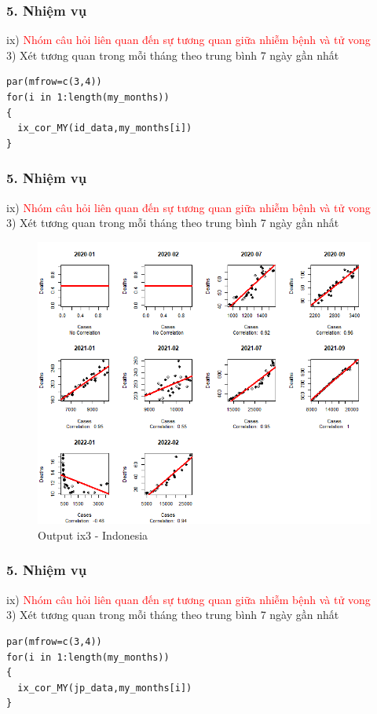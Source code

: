 \documentclass[english,10pt,table]{beamer}
\begin{document}
\begin{frame}[fragile]
\frametitle{5.  Nhiệm vụ}
ix) \textcolor{red}{Nhóm câu hỏi liên quan đến sự tương quan giữa nhiễm bệnh và tử vong}\\
3) Xét tương quan trong mỗi tháng theo trung bình 7 ngày gần nhất
  \lstset{
    title=Source code for Indonesia}
\begin{lstlisting}[frame=single]  
par(mfrow=c(3,4))
for(i in 1:length(my_months))
{
  ix_cor_MY(id_data,my_months[i])
}
\end{lstlisting}
\end{frame}

\begin{frame}[fragile]
\frametitle{5.  Nhiệm vụ}
ix) \textcolor{red}{Nhóm câu hỏi liên quan đến sự tương quan giữa nhiễm bệnh và tử vong}\\
3) Xét tương quan trong mỗi tháng theo trung bình 7 ngày gần nhất
	\begin{figure}[h!]
	\begin{center}
		    \includegraphics[scale = 0.36]{Images/IX/Indo (avg7).png}
		     \caption{Output ix3 - Indonesia}
		\end{center}
		\end{figure}
\end{frame}

\begin{frame}[fragile]
\frametitle{5.  Nhiệm vụ}
ix) \textcolor{red}{Nhóm câu hỏi liên quan đến sự tương quan giữa nhiễm bệnh và tử vong}\\
3) Xét tương quan trong mỗi tháng theo trung bình 7 ngày gần nhất
\lstset{
    title=Source code for Japan}
\begin{lstlisting}[frame=single]  
par(mfrow=c(3,4))
for(i in 1:length(my_months))
{
  ix_cor_MY(jp_data,my_months[i])
}
\end{lstlisting}
\end{frame}
\end{document}
